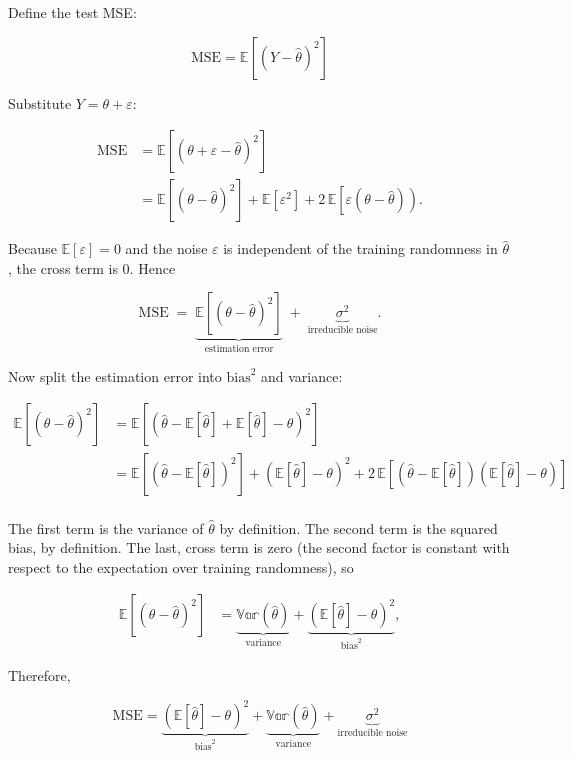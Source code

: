 Define the test MSE:

\begin{equation}
\mathrm{MSE} = \mathbb{E}\!\left[(Y - \hat \theta)^2\right]
\label{eq:mse-definition}
\end{equation}

Substitute $Y=\theta+\varepsilon$:

$$\begin{aligned}
\mathrm{MSE}
&= \mathbb{E}\!\left[(\theta+\varepsilon-\hat \theta)^2\right] \\
&= \mathbb{E}\!\left[(\theta-\hat \theta)^2\right] + \mathbb{E}[\varepsilon^2] + 2\,\mathbb{E}\!\left[\varepsilon\left(\theta-\hat \theta\right)\right).
\end{aligned}$$

Because $\mathbb{E}[\varepsilon]=0$ and the noise $\varepsilon$ is independent of the training randomness in $\hat \theta$, the cross term is $0$. Hence

$$\mathrm{MSE} \;=\; \underbrace{\mathbb{E}\!\left[(\theta-\hat \theta)^2\right]}_{\text{estimation error}}
\;+\; \underbrace{\sigma^2}_{\text{irreducible noise}}.$$

Now split the estimation error into $\mathrm{bias}^2$ and variance:

$$\begin{aligned}
\mathbb{E}\!\left[(\theta-\hat \theta)^2\right]
&= \mathbb{E}\!\left[(\hat \theta-\mathbb{E}[\hat \theta] + \mathbb{E}[\hat \theta]-\theta)^2\right] \\
&= \mathbb{E}\!\left[(\hat \theta-\mathbb{E}[\hat \theta])^2\right] + (\mathbb{E}[\hat \theta]-\theta)^2 + 2\,\mathbb{E}\!\left[(\hat \theta-\mathbb{E}[\hat \theta])(\mathbb{E}[\hat \theta]-\theta)\right] \\
\end{aligned}$$

The first term is the variance of $\hat{\theta}$ by definition. The second term is the squared bias, by definition. The last, cross term is zero (the second factor is constant with respect to the expectation over training randomness), so

$$\begin{aligned}
\mathbb{E}\!\left[(\theta-\hat \theta)^2\right] &= \underbrace{\mathbb{Var}(\hat \theta)}_{\text{variance}} + \underbrace{(\mathbb{E}[\hat \theta]-\theta)^2}_{\text{bias}^2},
\end{aligned}$$

Therefore,

\begin{equation}
\boxed{\ \mathrm{MSE} = \underbrace{(\mathbb{E}[\hat \theta]-\theta)^2}_{\text{bias}^2} + \underbrace{\mathbb{Var}(\hat \theta)}_{\text{variance}} + \underbrace{\sigma^2}_{\text{irreducible noise}}\ }
\label{eq:bias-variance-decomposition}
\end{equation}

